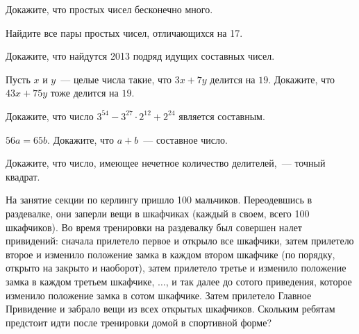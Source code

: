 \begin{problems}
\item
Докажите, что простых чисел бесконечно много.

\item
Найдите все пары простых чисел, отличающихся на 17.

\item
Докажите, что найдутся 2013 подряд идущих составных чисел.

\item
Пусть $x$ и $y$~--- целые числа такие, что $3 x + 7 y$ делится на $19$.
Докажите, что $43 x + 75 y$ тоже делится на $19$.

\item
Докажите, что число $3^{54} - 3^{27} \cdot 2^{12} + 2^{24}$ является составным.

\item
$56 a = 65 b$.
Докажите, что $a + b$~--- составное число.

\item
Докажите, что число, имеющее нечетное количество делителей,~--- точный квадрат.

\item
На занятие секции по керлингу пришло 100 мальчиков.
Переодевшись в раздевалке, они заперли вещи в шкафчиках
(каждый в своем, всего 100 шкафчиков).
Во время тренировки на раздевалку был совершен налет привидений: сначала
прилетело первое и открыло все шкафчики, затем прилетело второе и изменило
положение замка в каждом втором шкафчике
(по порядку, открыто на закрыто и наоборот),
затем прилетело третье и изменило положение замка в каждом третьем шкафчике,
$\ldots$, и так далее до сотого приведения, которое изменило положение замка в
сотом шкафчике.
Затем прилетело Главное Привидение и забрало вещи из всех открытых шкафчиков.
Скольким ребятам предстоит идти после тренировки домой в спортивной форме?

\end{problems}

